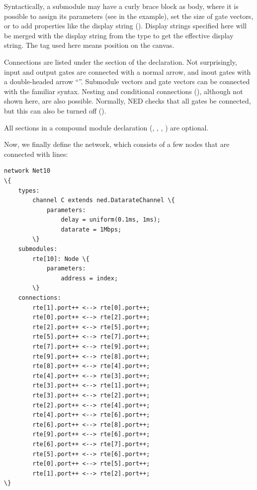Syntactically, a submodule may have a curly brace block as body, where
it is possible to assign its parameters (see  in the example),
set the size of gate vectors, or to add properties like the display string
(). Display strings specified here will be merged with the
display string from the type to get the effective display string.
The  tag used here means position on the canvas.

Connections are listed under the  section of the
declaration. Not surprisingly, input and output gates are
connected with a normal arrow, and inout gates with a double-headed
arrow ``\ttt{<-->}''. Submodule vectors and gate vectors can be
connected with the familiar  syntax. Nesting and conditional
connections (), although not shown here, are also possible.
Normally, NED checks that all gates be connected, but this can also
be turned off ().

All sections in a compound module declaration (,
, , ) are optional.

Now, we finally define the network, which consists of a few nodes that
are connected with lines:

\begin{Verbatim}[commandchars=\\\{\}]
network Net10
\{
    types:
        channel C extends ned.DatarateChannel \{
            parameters:
                delay = uniform(0.1ms, 1ms);
                datarate = 1Mbps;
        \}
    submodules:
        rte[10]: Node \{
            parameters:
                address = index;
        \}
    connections:
        rte[1].port++ <--> rte[0].port++;
        rte[0].port++ <--> rte[2].port++;
        rte[2].port++ <--> rte[5].port++;
        rte[5].port++ <--> rte[7].port++;
        rte[7].port++ <--> rte[9].port++;
        rte[9].port++ <--> rte[8].port++;
        rte[8].port++ <--> rte[4].port++;
        rte[4].port++ <--> rte[3].port++;
        rte[3].port++ <--> rte[1].port++;
        rte[3].port++ <--> rte[2].port++;
        rte[2].port++ <--> rte[4].port++;
        rte[4].port++ <--> rte[6].port++;
        rte[6].port++ <--> rte[8].port++;
        rte[9].port++ <--> rte[6].port++;
        rte[6].port++ <--> rte[7].port++;
        rte[5].port++ <--> rte[6].port++;
        rte[0].port++ <--> rte[5].port++;
        rte[1].port++ <--> rte[2].port++;
\}
\end{Verbatim}

